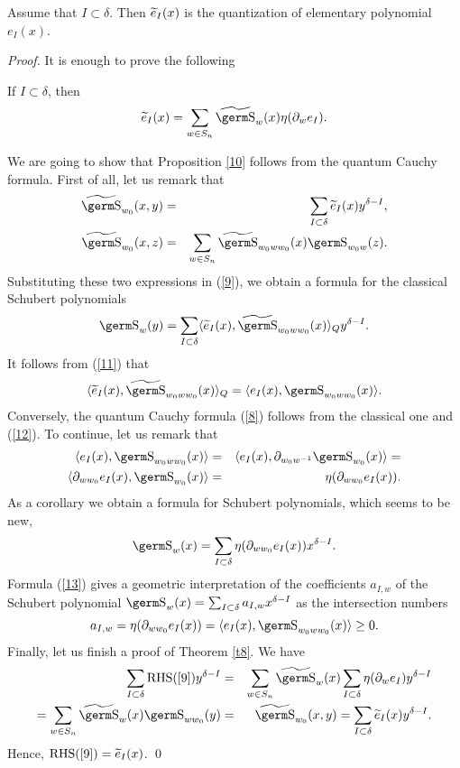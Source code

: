 {{\begin{th}\label{t8} Assume that $I\subset\delta$. Then ${\widetilde e}_I(x)$ is the 
quantization of elementary polynomial $e_I(x)$.
\end{th}

{\it Proof.} It is enough to prove the following 
\begin{pr}\label{10} If  $I\subset\delta$, then
\begin{equation} {\wt e}_I(x)=\sum_{w\in S_n}\wt{\s }_w(x)\eta 
(\partial_we_I).\label{9}
\end{equation}
\end{pr}
We are going to show that Proposition \ref{10} follows from the quantum 
Cauchy formula. First of all, let us remark that
\begin{eqnarray*}\wt{\s}_{w_0}(x,y)&=&\sum_{I\subset\delta}{\wt 
e}_I(x)y^{\delta -I},\\
\wt{\s}_{w_0}(x,z)&=&\sum_{w\in S_n}\wt{\s}_{w_0ww_0}(x)\s_{w_0w}(z).
\end{eqnarray*}
Substituting these two expressions in (\ref{9}), we obtain a formula for 
the classical Schubert polynomials
\begin{equation}\s_w(y)=\sum_{I\subset\delta}\langle{\wt 
e}_I(x),\wt{\s}_{w_0ww_0}(x)\rangle_Qy^{\delta -I}.\label{11}
\end{equation}
It follows from (\ref{11}) that
\begin{equation}\langle{\wt e}_I(x),\wt{\s}_{w_0ww_0}(x)\rangle_Q=
\langle e_I(x),\s_{w_0ww_0}(x)\rangle .\label{12}
\end{equation}
Conversely, the quantum Cauchy formula (\ref{8}) follows from the 
classical one and (\ref{12}). To continue, let us remark that
\begin{eqnarray*}
\langle e_I(x),\s_{w_0ww_0}(x)\rangle &=&
\langle e_I(x),\partial_{w_0w^{-1}}\s_{w_0}(x)\rangle =\\
\langle\partial_{ww_0}e_I(x),\s_{w_0}(x)\rangle 
&=&\eta (\partial_{ww_0}e_I(x)).
\end{eqnarray*}
As a corollary we obtain a formula for Schubert polynomials, 
which seems to be new,
\begin{equation} \s_w(x)=\sum_{I\subset\delta}\eta 
(\partial_{ww_0}e_I(x))x^{\delta -I}.\label{13}
\end{equation}
Formula (\ref{13}) gives a geometric interpretation of the coefficients 
$a_{I,w}$ of the Schubert polynomial 
$\s_w(x)=\sum_{I\subset\delta}a_{I,w}x^{\delta -I}$ as the intersection 
numbers
$$a_{I,w}=\eta (\partial_{ww_0}e_I(x))=\langle 
e_I(x),\s_{w_0ww_0}(x)\rangle \ge 0.
$$
Finally, let us finish a proof of Theorem \ref{t8}. We have
\begin{eqnarray*}\sum_{I\subset\delta}{\rm RHS}(\ref{9})y^{\delta -I}&=&
\sum_{w\in S_n}\wt{\s}_w(x)\sum_{I\subset\delta}\eta 
(\partial_we_I)y^{\delta -I}\\
=\sum_{w\in 
S_n}\wt{\s}_w(x)\s_{ww_0}(y)&=&\wt{\s}_{w_0}(x,y)=\sum_{I\subset\delta}{\wt 
e}_I(x)y^{\delta -I}.
\end{eqnarray*}
Hence, ${\rm RHS}(\ref{9})={\widetilde e}_I(x)$.
\qed

}}
